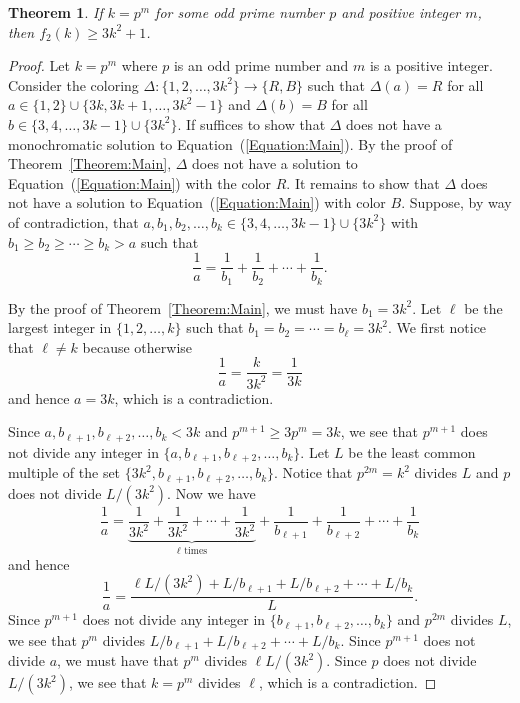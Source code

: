 \documentclass[10pt,a4paper]{amsart}
\newtheorem{theorem}{Theorem}[section]
\begin{document}
\begin{theorem}\label{Theorem:2-ColorPrimePowers}
    If $k=p^m$ for some odd prime number $p$ and positive integer $m$, then $f_2(k)\geq3k^2+1$.
\end{theorem}
\begin{proof}
Let $k=p^m$ where $p$ is an odd prime number and $m$ is a positive integer. Consider the coloring $\Delta:\{1,2,\ldots,3k^2\}\to\{R,B\}$ such that $\Delta(a)=R$ for all $a\in \{1,2\}\cup\{3k,3k+1,\ldots,3k^2-1\}$ and $\Delta(b)=B$ for all $b\in \{3,4,\ldots,3k-1\}\cup\{3k^2\}$. If suffices to show that $\Delta$ does not have a monochromatic solution to Equation~(\ref{Equation:Main}). By the proof of Theorem~\ref{Theorem:Main}, $\Delta$ does not have a solution to Equation~(\ref{Equation:Main}) with the color $R$. It remains to show that $\Delta$ does not have a solution to Equation~(\ref{Equation:Main}) with color $B$. Suppose, by way of contradiction, that $a,b_1,b_2,\ldots,b_k\in\{3,4,\ldots,3k-1\}\cup\{3k^2\}$ with $b_1\geq b_2\geq\cdots\geq b_k>a$ such that
\[
\frac{1}{a}=\frac{1}{b_1}+\frac{1}{b_2}+\cdots+\frac{1}{b_k}.
\]

By the proof of Theorem~\ref{Theorem:Main}, we must have $b_1=3k^2$. Let $\ell$ be the largest integer in $\{1,2,\ldots,k\}$ such that $b_1=b_2=\cdots=b_\ell=3k^2$. We first notice that $\ell\neq k$ because otherwise
\[
\frac{1}{a}=\frac{k}{3k^2}=\frac{1}{3k}
\]
and hence $a=3k$, which is a contradiction.

Since $a,b_{\ell+1},b_{\ell+2},\ldots,b_{k}<3k$ and $p^{m+1}\geq 3p^m=3k$, we see that $p^{m+1}$ does not divide any integer in $\{a,b_{\ell+1},b_{\ell+2},\ldots,b_{k}\}$. Let $L$ be the least common multiple of the set $\{3k^2,b_{\ell+1},b_{\ell+2},\ldots,b_k\}$. Notice that $p^{2m}=k^2$ divides $L$ and $p$ does not divide $L/(3k^2)$. Now we have
\[
\frac{1}{a}=\underbrace{\frac{1}{3k^2}+\frac{1}{3k^2}+\cdots+\frac{1}{3k^2}}_{\ell\text{ times}}+\frac{1}{b_{\ell+1}}+\frac{1}{b_{\ell+2}}+\cdots+\frac{1}{b_k}
\]
and hence
\[
\frac{1}{a}=\frac{\ell L/(3k^2)+L/b_{\ell+1}+L/b_{\ell+2}+\cdots+L/b_k}{L}.
\]
Since $p^{m+1}$ does not divide any integer in $\{b_{\ell+1},b_{\ell+2},\ldots,b_{k}\}$ and $p^{2m}$ divides $L$, we see that $p^m$ divides $L/b_{\ell+1}+L/b_{\ell+2}+\cdots+L/b_k$. Since $p^{m+1}$ does not divide $a$, we must have that $p^m$ divides $\ell L/(3k^2)$. Since $p$ does not divide $L/(3k^2)$, we see that $k=p^m$ divides $\ell$, which is a contradiction.
\end{proof}
\end{document}
